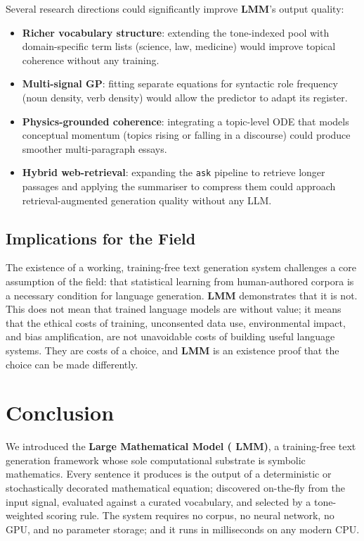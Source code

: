 \documentclass[11pt,a4paper]{article}
\newcommand{\lmm}{\texorpdfstring{%
  \textbf{\color{lmmAccent}LMM}}{LMM}}
\begin{document}
Several research directions could significantly improve \lmm{}'s output quality:
\begin{itemize}[noitemsep,topsep=4pt]
  \item \textbf{Richer vocabulary structure}: extending the tone-indexed pool with domain-specific term lists (science, law, medicine) would improve topical coherence without any training.
  \item \textbf{Multi-signal GP}: fitting separate equations for syntactic role frequency (noun density, verb density) would allow the predictor to adapt its register.
  \item \textbf{Physics-grounded coherence}: integrating a topic-level ODE that models conceptual momentum (topics rising or falling in a discourse) could produce smoother multi-paragraph essays.
  \item \textbf{Hybrid web-retrieval}: expanding the \texttt{ask} pipeline to retrieve longer passages and applying the summariser to compress them could approach retrieval-augmented generation quality without any LLM.
\end{itemize}

\subsection{Implications for the Field}

The existence of a working, training-free text generation system challenges a core assumption of the field: that statistical learning from human-authored corpora is a necessary condition for language generation. \lmm{} demonstrates that it is not. This does not mean that trained language models are without value; it means that the ethical costs of training, unconsented data use, environmental impact, and bias amplification, are not unavoidable costs of building useful language systems. They are costs of a choice, and \lmm{} is an existence proof that the choice can be made differently.

\section{Conclusion}
\label{sec:conclusion}

We introduced the \textbf{Large Mathematical Model (\lmm{})}, a training-free text generation framework whose sole computational substrate is symbolic mathematics. Every sentence it produces is the output of a deterministic or stochastically decorated mathematical equation; discovered on-the-fly from the input signal, evaluated against a curated vocabulary, and selected by a tone-weighted scoring rule. The system requires no corpus, no neural network, no GPU, and no parameter storage; and it runs in milliseconds on any modern CPU.
\end{document}
